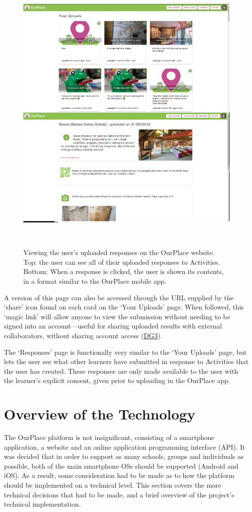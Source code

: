 \begin{figure}
  \centering
  \includegraphics[width=0.85\columnwidth]{images/chapter05/webResults.png}
  \caption[The OurPlace website: the user's responses]{Viewing the user's uploaded responses on the OurPlace website. Top: the user can see all of their uploaded responses to Activities. Bottom: When a response is clicked, the user is shown its contents, in a format similar to the OurPlace mobile app.}~\label{fig:websiteResults}
\end{figure}

A version of this page can also be accessed through the URL supplied by the `share' icon found on each card on the `Your Uploads' page. When followed, this `magic link' will allow anyone to view the submission without needing to be signed into an account---useful for sharing uploaded results with external collaborators, without sharing account access (\hyperref[DG3]{DG3}).

The `Responses' page is functionally very similar to the `Your Uploads' page, but lets the user see what other learners have submitted in response to Activities that the user has created. These responses are only made available to the user with the learner's explicit consent, given prior to uploading in the OurPlace app.

\section{Overview of the Technology}
The OurPlace platform is not insignificant, consisting of a smartphone application, a website and an online application programming interface (API). It was decided that in order to support as many schools, groups and individuals as possible, both of the main smartphone OSs should be supported (Android and iOS). As a result, some consideration had to be made as to how the platform should be implemented on a technical level. This section covers the more technical decisions that had to be made, and a brief overview of the project's technical implementation.

